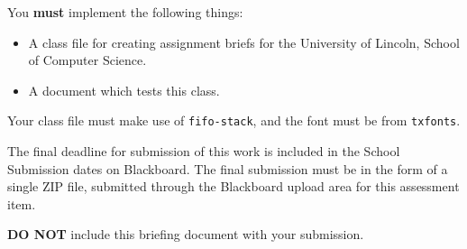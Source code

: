\documentclass{lincolncsbrief}
\begin{document}
	\makebriefheader
		
	\begin{learningoutcomes}
	\end{learningoutcomes}
	
	\begin{requirements}
		
		You \textbf{must} implement the following things:
		\begin{itemize}
			\item A class file for creating assignment briefs for the University of Lincoln, School of Computer Science.
			\item A document which tests this class.
		\end{itemize}
		
		
		Your class file must make use of \texttt{fifo-stack}, and the font must be from \texttt{txfonts}.
				
	\end{requirements}
	
	
	\setparagraphspacing
	
	\begin{submission}
		The final deadline for submission of this work is included in the School Submission dates on Blackboard. The final submission must be in the form of a single ZIP file, submitted through the Blackboard upload area for this assessment item. 
		
		\blindtext
		
		\textbf{DO NOT} include this briefing document with your submission.
	\end{submission}
	
	
	
\end{document}
